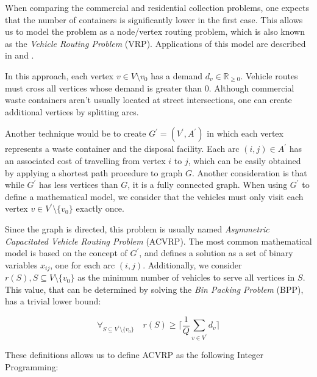 When comparing the commercial and residential collection problems, one expects
that the number of containers is significantly lower in the first case. This
allows us to model the problem as a node/vertex routing problem, which is also
known as the \textit{Vehicle Routing Problem} (VRP). Applications of this model
are described in \citet{Tung2000} and \citet{Kim06}.

In this approach, each vertex $v \in V \setminus {v_0}$ has a demand $d_v \in
\mathbb{R}_{\geq0}$. Vehicle routes must cross all vertices whose demand is
greater than $0$. Although commercial waste containers aren't usually located
at street intersections, one can create additional vertices by splitting arcs.

Another technique would be to create $G^\prime = (V^\prime, A^\prime)$ in which
each vertex represents a waste container and the disposal facility. Each arc
$(i, j) \in A^\prime$ has an associated cost of travelling from vertex $i$ to
$j$, which can be easily obtained by applying a shortest path procedure to
graph $G$. Another consideration is that while $G^\prime$ has less vertices
than $G$, it is a fully connected graph. When using $G^\prime$ to define a
mathematical model, we consider that the vehicles must only visit each vertex
$v \in V^\prime \setminus \{v_0\}$ exactly once.

Since the graph is directed, this problem is usually named \textit{Asymmetric
Capacitated Vehicle Routing Problem} (ACVRP).  The most common mathematical
model\citep{Toth01} is based on the concept of $G^\prime$, and defines a
solution as a set of binary variables $x_{ij}$, one for each arc $(i, j)$.
Additionally, we consider $r(S), S \subseteq V \setminus \{v_0\}$ as the
minimum number of vehicles to serve all vertices in $S$. This value, that can
be determined by solving the \textit{Bin Packing Problem} (BPP), has a trivial lower
bound:

\begin{equation}
\forall_{S \subseteq V^\prime \setminus \{v_0\}} \quad r(S) \geq
\lceil\frac{1}{Q} \sum_{v \in V^\prime} d_{v} \rceil
\end{equation}

These definitions allows us to define ACVRP as the following Integer Programming:


